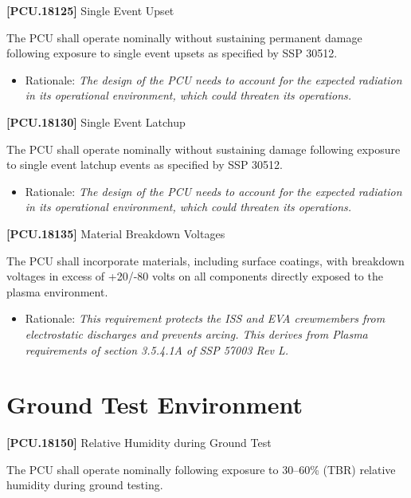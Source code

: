 \textbf{[PCU.18125]} Single Event Upset

The \gls{PCU} shall operate nominally without sustaining permanent damage following exposure to single event upsets as specified by SSP 30512.

\begin{itemize}
\item{} Rationale: \emph{The design of the PCU needs to account for the expected radiation in its operational environment, which could threaten its operations.}

\end{itemize}

\textbf{[PCU.18130]} Single Event Latchup

The \gls{PCU} shall operate nominally without sustaining damage following exposure to single event latchup events as specified by SSP 30512.

\begin{itemize}
\item{} Rationale: \emph{The design of the PCU needs to account for the expected radiation in its operational environment, which could threaten its operations.}

\end{itemize}

\textbf{[PCU.18135]} Material Breakdown Voltages

The \gls{PCU} shall incorporate materials, including surface coatings, with breakdown voltages in excess of +20\slash -80 volts on all components directly exposed to the plasma environment.

\begin{itemize}
\item{} Rationale: \emph{This requirement protects the ISS and EVA crewmembers from electrostatic discharges and prevents arcing. This derives from Plasma requirements of section 3.5.4.1A of SSP 57003 Rev L.}

\end{itemize}

\section{Ground Test Environment}
\label{groundtestenvironment}

\textbf{[PCU.18150]} Relative Humidity during Ground Test

The \gls{PCU} shall operate nominally following exposure to 30--60\% (TBR\label{tbx_21}) relative humidity during ground testing.

